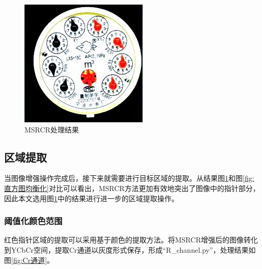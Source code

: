 \documentclass[a4paper]{ctexart}
\begin{document}
\begin{figure}[htbp]
\begin{minipage}[t]{0.25\textwidth}
		\includegraphics[width=\textwidth]{figure/msrcr/img5.jpg}
	\end{minipage}
	\caption{MSRCR处理结果}\label{fig:MSRCR}
\end{figure}

\subsection{区域提取}
当图像增强操作完成后，接下来就需要进行目标区域的提取。从结果图\ref{fig:MSRCR}和图\ref{fig:直方图均衡化}对比可以看出，MSRCR方法更加有效地突出了图像中的指针部分，因此本文选用图\ref{fig:MSRCR}中的结果进行进一步的区域提取操作。
\subsubsection{阈值化颜色范围}\label{sec:阈值化}
红色指针区域的提取可以采用基于颜色的提取方法。将MSRCR增强后的图像转化到YCbCr空间，提取Cr通道以灰度形式保存，形成“R\_channel.py”，处理结果如图\ref{fig:Cr通道}。
\end{document}

